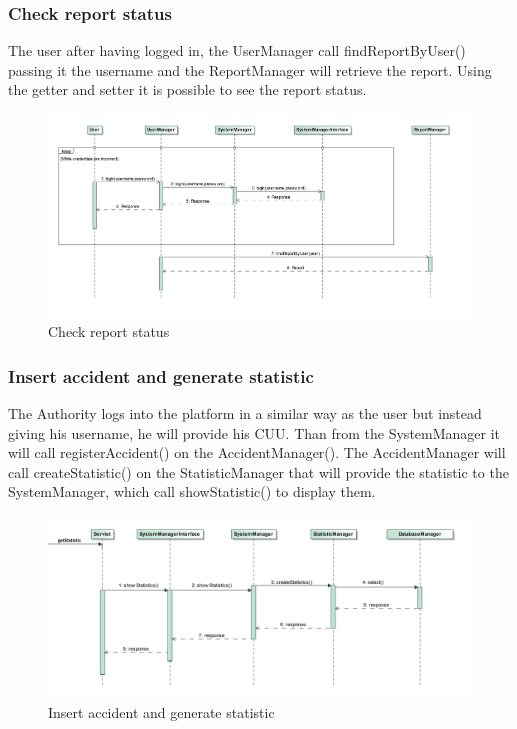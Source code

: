 \subsubsection{Check report status}
The user after having logged in, the UserManager call findReportByUser() passing it the username and the ReportManager will retrieve the report. Using the getter and setter it is possible to see the report status.
\begin{figure}
	\centering
	\includegraphics[width=0.95\linewidth, height=0.4\textheight]{Images/RunTimeDiagram/Sequence3}
	\caption{Check report status}
	\label{fig:Check report status}
\end{figure}
\subsubsection{Insert accident and generate statistic}
The Authority logs into the platform in a similar way as the user but instead giving his username, he will provide his CUU. Than from the SystemManager it will call registerAccident() on the AccidentManager(). The AccidentManager will call createStatistic() on the StatisticManager that will provide the statistic to the SystemManager, which call showStatistic() to display them.
\begin{figure}
	\centering
	\includegraphics[width=0.95\linewidth, height=0.45\textheight]{Images/RunTimeDiagram/Sequence4}
	\caption{Insert accident and generate statistic}
	\label{fig:Insert accident and generate statistic}
\end{figure}
